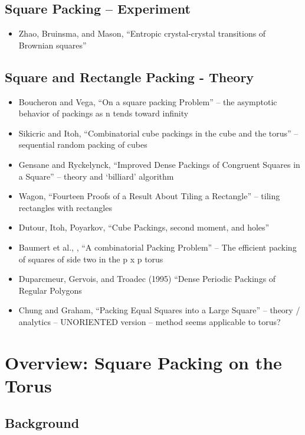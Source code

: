 \documentclass[11pt]{article}
\begin{document}
\subsection{Square Packing -- Experiment}
\label{sec-1.6}

\begin{itemize}
\item Zhao, Bruinsma, and Mason, ``Entropic crystal-crystal transitions of Brownian squares'' \cite{Zhao2011}
\end{itemize}
\subsection{Square and Rectangle Packing - Theory}
\label{sec-1.7}

\begin{itemize}
\item Boucheron and Vega, ``On a square packing Problem'' -- the asymptotic behavior of packings as n tends toward infinity \cite{Boucheron2000}
\item Sikicric and Itoh, ``Combinatorial cube packings in the cube and the torus'' -- sequential random packing of cubes \cite{Sikiric2010}
\item Gensane and Ryckelynck, ``Improved Dense Packings of Congruent Squares in a Square'' -- theory and `billiard' algorithm \cite{Gensane2004}
\item Wagon, ``Fourteen Proofs of a Result About Tiling a Rectangle'' \cite{Wagon1994} -- tiling rectangles with rectangles
\item Dutour, Itoh, Poyarkov, ``Cube Packings, second moment, and holes'' \cite{DutourSikiric2007}
\item Baumert et al., , ``A combinatorial Packing Problem'' \cite{Baumert1970} -- The efficient packing of squares of side two in the p x p torus
\item Duparcmeur, Gervois, and Troadec (1995) ``Dense Periodic Packings of Regular Polygons \cite{Duparcmeur1995}
\item Chung and Graham,  ``Packing Equal Squares into a Large Square'' \cite{Chung2009} -- theory / analytics -- UNORIENTED version -- method seems applicable to torus?
\end{itemize}
\section{Overview: Square Packing on the Torus}
\label{sec-2}

\subsection{Background}
\label{sec-2.1}
\end{document}
